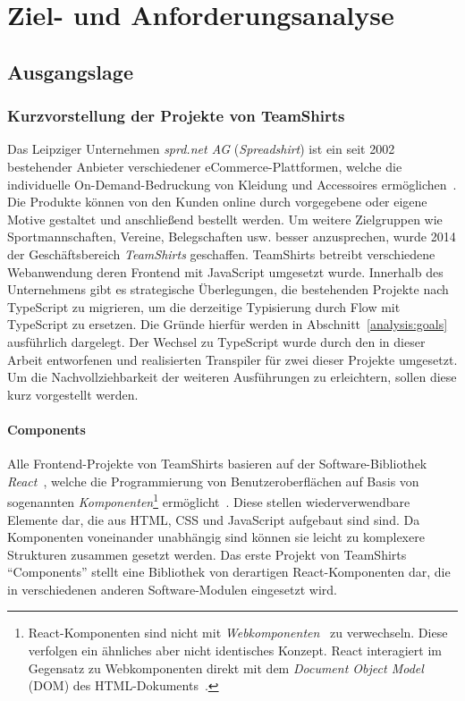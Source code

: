\chapter{Ziel- und Anforderungsanalyse}
\label{chap:analysis}

\section{Ausgangslage}
\label{sec:status-quo}

\subsection{Kurzvorstellung der Projekte von TeamShirts}

Das Leipziger Unternehmen \textit{sprd.net AG} (\textit{Spreadshirt}) ist ein seit 2002 bestehender Anbieter verschiedener eCommerce-Plattformen, welche die individuelle On-Demand-Bedruckung von Kleidung und Accessoires ermöglichen~\autocite{SPREADSHIRT:ABOUT}. Die Produkte können von den Kunden online durch vorgegebene oder eigene Motive gestaltet und anschließend bestellt werden. Um weitere Zielgruppen wie Sportmannschaften, Vereine, Belegschaften usw. besser anzusprechen, wurde 2014 der Geschäftsbereich \textit{TeamShirts} geschaffen.
TeamShirts betreibt verschiedene Webanwendung deren Frontend mit JavaScript umgesetzt wurde. Innerhalb des Unternehmens gibt es strategische Überlegungen, die bestehenden Projekte nach TypeScript zu migrieren, um die derzeitige Typisierung durch Flow mit TypeScript zu ersetzen. Die Gründe hierfür werden in Abschnitt~\ref{analysis:goals} ausführlich dargelegt. Der Wechsel zu TypeScript wurde durch den in dieser Arbeit entworfenen und realisierten Transpiler für zwei dieser Projekte umgesetzt. Um die Nachvollziehbarkeit der weiteren Ausführungen zu erleichtern, sollen diese kurz vorgestellt werden.

\subsubsection{Components}

Alle Frontend-Projekte von TeamShirts basieren auf der Software-Bibliothek \textit{React}~\autocite{SOFTWARE:REACT}, welche die Programmierung von Benutzeroberflächen auf Basis von sogenannten \emph{Komponenten}\footnote{React-Komponenten sind nicht mit \textit{Webkomponenten}~\autocite{MDN:WEBCOMPONENTS} zu verwechseln. Diese verfolgen ein ähnliches aber nicht identisches Konzept. React interagiert im Gegensatz zu Webkomponenten direkt mit dem \textit{Document Object Model} (DOM) des HTML-Dokuments~\autocite{REACT:WEBCOMPONENTS}.} ermöglicht~\autocite{ACM:REACT}. Diese stellen wiederverwendbare Elemente dar, die aus HTML, CSS und JavaScript aufgebaut sind sind. Da Komponenten voneinander unabhängig sind können sie leicht zu komplexere Strukturen zusammen gesetzt werden. Das erste Projekt von TeamShirts \enquote{Components} stellt eine Bibliothek von derartigen React-Komponenten dar, die in verschiedenen anderen Software-Modulen eingesetzt wird.

